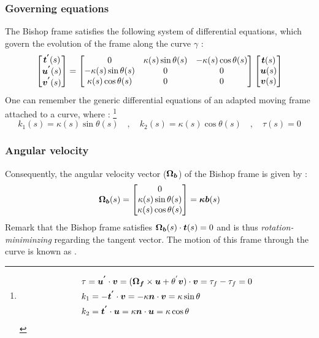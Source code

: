 \subsubsection{Governing equations}
The Bishop frame satisfies the following system of differential equations, which govern the evolution of the frame along the curve $\gamma$ :
\begin{equation}
	\begin{bmatrix}
		\boldsymbol{t^{'}}(s) \\
		\boldsymbol{u^{'}}(s) \\
		\boldsymbol{v^{'}}(s)
	\end{bmatrix}
	=
	\begin{bmatrix}
		0 & \kappa(s) \sin \theta(s) & -\kappa(s) \cos \theta(s) \\
		-\kappa(s) \sin \theta(s) & 0 & 0 \\
		\kappa(s) \cos \theta(s) & 0 & 0
	\end{bmatrix}
	\begin{bmatrix}
		\boldsymbol{t}(s) \\
		\boldsymbol{u}(s) \\
		\boldsymbol{v}(s)
	\end{bmatrix}
\label{eq:3_12}
\end{equation}
One can remember the generic differential equations of an adapted moving frame attached to a curve, where : \footnote{
\begin{equation*}
	\begin{aligned}
		&\tau =\boldsymbol{u^{'}} \cdot \boldsymbol{v} = (\boldsymbol{\Omega_f} \times \boldsymbol{u} + \theta^{'} \boldsymbol{v})\cdot  \boldsymbol{v} = \tau_f - \tau_f = 0\\
		&k_1 = -\boldsymbol{t^{'}} \cdot \boldsymbol{v} = -\kappa \boldsymbol{n} \cdot \boldsymbol{v} = \kappa \sin \theta \\
		&k_2 = \boldsymbol{t^{'}} \cdot \boldsymbol{u} = \kappa \boldsymbol{n} \cdot \boldsymbol{u} = \kappa \cos \theta
	\end{aligned}
\end{equation*}
}
\begin{equation}
k_{1}(s) = \kappa(s) \sin \theta(s)
\quad,\quad
k_{2}(s) = \kappa(s) \cos \theta(s)
\quad,\quad
\tau(s) = 0
\end{equation}

\subsubsection{Angular velocity}\label{sec:bishopvelocity}
Consequently, the angular velocity vector ($\boldsymbol{\Omega_{b}}$) of the Bishop frame is given by :
\begin{equation}
	\boldsymbol{\Omega_b}(s) 
	=
	\begin{bmatrix}
		0\\
		\kappa(s) \sin \theta(s)\\
		\kappa(s) \cos \theta(s)
	\end{bmatrix}
	= \boldsymbol{\kappa b}(s) 
\end{equation}
Remark that the Bishop frame satisfies $\boldsymbol{\Omega_b}(s) \cdot \boldsymbol{t}(s) = 0$ and is thus \emph{rotation-miniminzing} regarding the tangent vector. The motion of this frame through the curve is known as .

